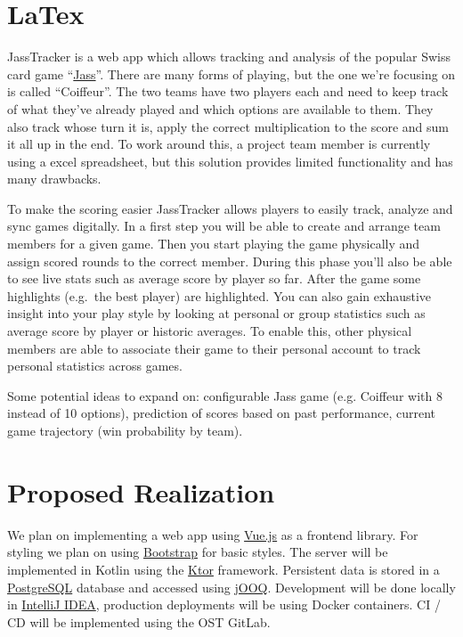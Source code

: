 \section{LaTex}

JassTracker is a web app which allows tracking and analysis of the popular Swiss card game ``\href{https://de.wikipedia.org/wiki/Jass}{Jass}''.
There are many forms of playing, but the one we're focusing on is called ``Coiffeur''.
The two teams have two players each and need to keep track of what they've already played and which options are available to them.
They also track whose turn it is, apply the correct multiplication to the score and sum it all up in the end.
To work around this, a project team member is currently using a excel spreadsheet, but this solution provides limited functionality and has many drawbacks.

To make the scoring easier JassTracker allows players to easily track, analyze and sync games digitally.
In a first step you will be able to create and arrange team members for a given game.
Then you start playing the game physically and assign scored rounds to the correct member.
During this phase you'll also be able to see live stats such as average score by player so far.
After the game some highlights (e.g.\ the best player) are highlighted.
You can also gain exhaustive insight into your play style by looking at personal or group statistics such as average score by player or historic averages.
To enable this, other physical members are able to associate their game to their personal account to track personal statistics across games.


Some potential ideas to expand on: configurable Jass game (e.g. Coiffeur with 8 instead of 10 options), prediction of scores based on past performance, current game trajectory (win probability by team).

\section{Proposed Realization}

We plan on implementing a web app using \href{https://vuejs.org/}{Vue.js} as a frontend library.
For styling we plan on using \href{https://getbootstrap.com/}{Bootstrap} for basic styles.
The server will be implemented in Kotlin using the \href{https://ktor.io/}{Ktor} framework.
Persistent data is stored in a \href{https://www.postgresql.org/}{PostgreSQL} database and accessed using \href{https://www.jooq.org/}{jOOQ}.
Development will be done locally in \href{https://www.jetbrains.com/idea/}{IntelliJ IDEA}, production deployments will be using Docker containers.
CI / CD will be implemented using the OST GitLab.
